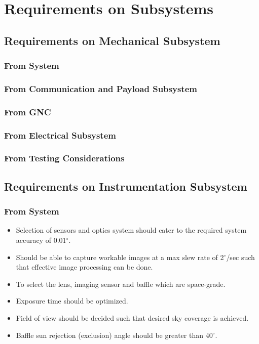 \chapter{Requirements on Subsystems}
\thispagestyle{fancy}

\section{Requirements on Mechanical Subsystem}
\subsection{From System}
\subsection{From Communication and Payload Subsystem} 
\subsection{From GNC} 
\subsection{From Electrical Subsystem}
\subsection {From Testing Considerations} 


\newpage
\section{Requirements on Instrumentation Subsystem}
\subsection{From System}
\begin{itemize}
    \item Selection of sensors and optics system should cater to the required system accuracy of 0.01$^{\circ}$.
    \item Should be able to capture workable images at a max slew rate of 2$^{\circ}$/sec such that effective image processing can be done.
    \item To select the lens, imaging sensor and baffle which are space-grade.
    \item Exposure time should be optimized.
    \item Field of view should be decided such that desired sky coverage is achieved.
    \item Baffle sun rejection (exclusion) angle should be greater than 40$^{\circ}$.
\end{itemize}
